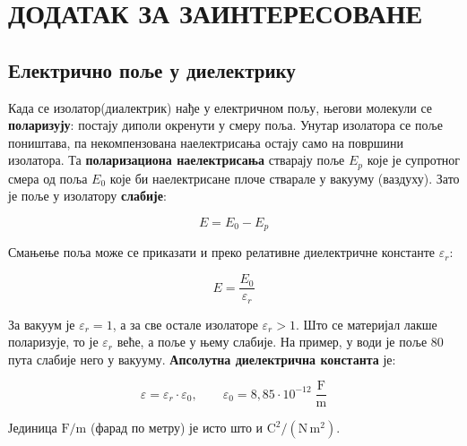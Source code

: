 \documentclass{article}
\begin{document}
\section{ДОДАТАК ЗА ЗАИНТЕРЕСОВАНЕ}

\subsection{Електрично поље у диелектрику}

Када се изолатор(диалектрик) нађе у електричном пољу, његови молекули се \textbf{поларизују}: постају диполи окренути у смеру поља. Унутар изолатора се поље поништава, па некомпензована наелектрисања остају само на површини изолатора. Та \textbf{поларизациона наелектрисања} стварају поље $E_p$ које је супротног смера од поља $E_0$ које би наелектрисане плоче стварале у вакууму (ваздуху). Зато је поље у изолатору \textbf{слабије}:

\begin{equation}
    E = E_0 - E_p
\end{equation}

Смањење поља може се приказати и преко релативне диелектричне константе $\varepsilon_r$:

\begin{equation}
    E = \frac{E_0}{\varepsilon_r}
\end{equation}

За вакуум је $\varepsilon_r = 1$, а за све остале изолаторе $\varepsilon_r > 1$. Што се материјал лакше поларизује, то је $\varepsilon_r$ веће, а поље у њему слабије. На пример, у води је поље 80 пута слабије него у вакууму. \textbf{Апсолутна диелектрична константа} је:

\begin{equation}
    \varepsilon = \varepsilon_r \cdot \varepsilon_0, \qquad \varepsilon_0 = 8{,}85 \cdot 10^{-12} \; \frac{\mathrm{F}}{\mathrm{m}}
\end{equation}

Јединица $\mathrm{F/m}$ (фарад по метру) је исто што и $\mathrm{C^2/(N\,m^2)}$.
\end{document}
